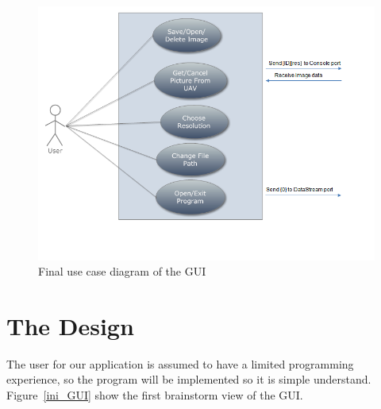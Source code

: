 \begin{figure}[!hbtp]
\begin{center}
\includegraphics[scale=0.7]{figures/FinaluserCase.png} 
\end{center}
\caption{Final use case diagram of the GUI\label{GUI_finalUseCase}}
\end{figure}



\section{The Design}

The user for our application is assumed to have a limited programming experience, so the program will be implemented so it is simple understand. Figure~\ref{ini_GUI} show the first brainstorm view of the GUI. 

